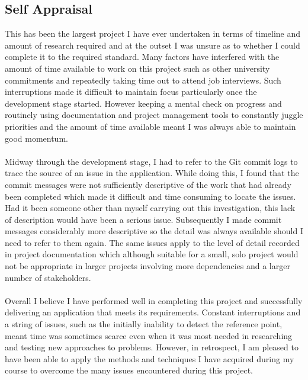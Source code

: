 	\subsection{Self Appraisal}
		This has been the largest project I have ever undertaken in terms of timeline and amount of research required and at the outset I was unsure as to whether I could  complete it to the required standard. Many factors have interfered with the amount of time available to work on this project such as other university commitments and repeatedly taking time out to attend job interviews. Such interruptions made it difficult to maintain focus particularly once the development stage started. However keeping a mental check on progress and routinely using documentation and project management tools to constantly juggle priorities and the amount of time available meant I was always able to maintain good momentum.
		\\\\
		Midway through the development stage, I had to refer to the Git commit logs to trace the source of an issue in the application. While doing this, I found that the commit messages were not sufficiently descriptive of the work that had already been completed which made
		it difficult and time consuming to locate the issues. Had it been someone other than myself carrying out this investigation, this lack of description would have been a serious issue. Subsequently I made commit messages considerably more descriptive so the detail was always available should I need to refer to them again. The same issues apply to the level of detail recorded in project documentation which although suitable for a small, solo project would not be appropriate in larger projects involving more dependencies and a larger number of stakeholders. 
		\\\\
		Overall I believe I have performed well in completing this project and successfully delivering an application that meets its requirements. Constant interruptions and a string of issues, such as the initially inability to detect the reference point, meant time was sometimes scarce even when it was most needed in researching and testing new approaches to problems. However, in retrospect, I am pleased to have been able to apply the methods and techniques I have acquired during my course to overcome the many issues encountered during this project.
		